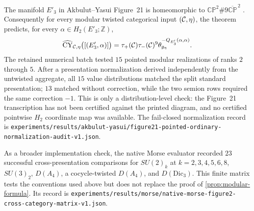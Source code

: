 \begin{example}
\label{ex:figure21-pointed}
The manifold $E'_3$ in Akbulut--Yasui Figure~21 is homeomorphic to
$\mathbb{CP}^2\#9\overline{\mathbb{CP}}^{\,2}$
\cite[Section~6, Theorem~6.1 and Figure~21]{AkbulutYasui2008}.  Consequently
for every modular twisted categorical input \((\mathcal{C},\eta)\), the theorem
predicts, for every \(\alpha\in H_2(E'_3;\mathbb Z)\),
\[
 \widehat{\operatorname{CY}}_{\mathcal{C},\eta}\bigl([(E'_3,\alpha)]\bigr)
 =\tau_+(\mathcal{C})\tau_-(\mathcal{C})^9
  \theta_{g_\eta}^{-Q_{E'_3}(\alpha,\alpha)}.
\]
The retained numerical batch tested $15$ pointed modular
realizations of ranks $2$ through $5$.  After a presentation normalization
derived independently from the untwisted aggregate, all $15$ value
distributions matched the split standard presentation; $13$ matched without
correction, while the two semion rows required the same correction $-1$.
This is only a distribution-level check: the Figure~21 transcription has not
been certified against the printed diagram, and no certified pointwise
$H_2$ coordinate map was available.  The fail-closed normalization record is
\nolinkurl{experiments/results/akbulut-yasui/figure21-pointed-ordinary-normalization-audit-v1.json}.
\end{example}

As a broader implementation check, the native Morse evaluator recorded
$23$ successful cross-presentation comparisons for
$SU(2)_k$ at $k=2,3,4,5,6,8$, $SU(3)_2$, $D(A_4)$, a cocycle-twisted
$D(A_4)$, and $D(\mathrm{Dic}_3)$.  This finite matrix tests the conventions
used above but does not replace the proof of \cref{prop:modular-formula}.  Its
record is
\nolinkurl{experiments/results/morse/native-morse-figure2-cross-category-matrix-v1.json}.
